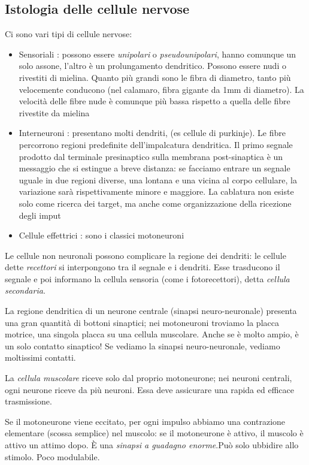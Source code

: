 \documentclass[a4paper,12pt]{article}
\begin{document}
\subsection{Istologia delle cellule nervose}
Ci sono vari tipi di cellule nervose:
\begin{itemize}
\item{Sensoriali : possono essere \emph{unipolari} o \emph{pseudounipolari}, hanno comunque un solo assone, l'altro è un prolungamento dendritico. Possono essere nudi o rivestiti di mielina. Quanto più grandi sono le fibra di diametro, tanto più velocemente conducono (nel calamaro, fibra gigante da 1mm di diametro). La velocità delle fibre nude è comunque più bassa rispetto a quella delle fibre rivestite da mielina}
\item{Interneuroni : presentano molti dendriti, (es cellule di purkinje). Le fibre percorrono regioni predefinite dell'impalcatura dendritica. Il primo segnale prodotto dal terminale presinaptico sulla membrana post-sinaptica è un messaggio che si estingue a breve distanza: se facciamo entrare un segnale uguale in due regioni diverse, una lontana e una vicina al corpo cellulare, la variazione sarà rispettivamente minore e maggiore. La cablatura non esiste solo come ricerca dei target, ma anche come organizzazione della ricezione degli imput}
\item{Cellule effettrici : sono i classici motoneuroni}
\end{itemize}

Le cellule non neuronali possono complicare la regione dei dendriti: le cellule dette \emph{recettori} si interpongono tra il segnale e i dendriti. Esse trasducono il segnale e poi informano la cellula sensoria (come i fotorecettori), detta \emph{cellula secondaria}.

La regione dendritica di un neurone centrale (sinapsi neuro-neuronale) presenta una gran quantità di bottoni sinaptici; nei motoneuroni troviamo la placca motrice, una singola placca su una cellula muscolare. Anche se è molto ampio, è un solo contatto sinaptico!
Se vediamo la sinapsi neuro-neuronale, vediamo moltissimi contatti.

La \emph{cellula muscolare} riceve solo dal proprio motoneurone; nei neuroni centrali, ogni neurone riceve da più neuroni. Essa deve assicurare una rapida ed efficace trasmissione. 

Se il motoneurone viene eccitato, per ogni impulso abbiamo una contrazione elementare (scossa semplice) nel muscolo: se il motoneurone è attivo, il muscolo è attivo un attimo dopo. È una \emph{sinapsi a guadagno enorme}.Può solo ubbidire allo stimolo. Poco modulabile.
\end{document}
